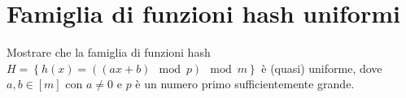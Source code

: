 \chapter{Famiglia di funzioni hash uniformi}

\begin{problem*}
    Mostrare che la famiglia di funzioni hash 
    \(H = \left\{h(x) = ((ax + b ) \mod p) \mod m\right\}\) \`e (quasi) uniforme, dove 
    \(a,b\in [m]\) con \(a\neq 0\) e \(p\) \`e un numero primo sufficientemente grande.
\end{problem*}

